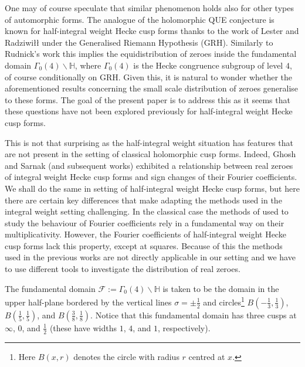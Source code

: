 \documentclass[a4paper,10pt,twoside]{amsart}
\theoremstyle{definition}
\numberwithin{equation}{section}
\renewcommand\:{\colon}
\begin{document}
One may of course speculate that similar phenomenon holds also for other types of automorphic forms. The analogue of the holomorphic QUE conjecture is known for half-integral weight Hecke cusp forms thanks to the work of Lester and Radziwi{\l\l} \cite{Lester-Radziwill2020} under the Generalised Riemann Hypothesis (GRH). Similarly to Rudnick's work this implies the equidistribution of zeroes inside the fundamental domain $\Gamma_0(4)\backslash\mathbb H$, where $\Gamma_0(4)$ is the Hecke congruence subgroup of level $4$, of course conditionally on GRH. Given this, it is natural to wonder whether the aforementioned results concerning the small scale distribution of zeroes generalise to these forms. The goal of the present paper is to address this as it seems that these questions have not been explored previously for half-integral weight Hecke cusp forms.  

This is not that surprising as the half-integral weight situation has features that are not present in the setting of classical holomorphic cusp forms. Indeed, Ghosh and Sarnak (and subsequent works) exhibited a relationship between real zeroes of integral weight Hecke cusp forms and sign changes of their Fourier coefficients. We shall do the same in setting of half-integral weight Hecke cusp forms, but here there are certain key differences that make adapting the methods used in the integral weight setting challenging. In the classical case the methods of \cite{Ghosh-Sarnak2012, Matomaki2016, Lester-Matomaki-Radziwill2018} used to study the behaviour of Fourier coefficients rely in a fundamental way on their multiplicativity. However, the Fourier coefficients of half-integral weight Hecke cusp forms lack this property, except at squares. Because of this the methods used in the previous works are not directly applicable in our setting and we have to use different tools to investigate the distribution of real zeroes.

The fundamental domain $\mathcal F:=\Gamma_0(4)\backslash\mathbb H$ is taken to be the domain in the upper half-plane bordered by the vertical lines $\sigma=\pm\frac12$ and circles\footnote{Here $B(x,r)$ denotes the circle with radius $r$ centred at $x$.} $B(-\frac13,\frac13)$, $B(\frac15,\frac15)$, and $B(\frac38,\frac18)$. Notice that this fundamental domain has three cusps at $\infty$, $0$, and $\frac12$ (these have widths $1$, $4$, and $1$, respectively). 
\end{document}
